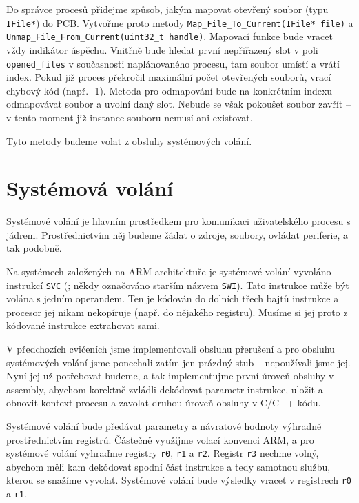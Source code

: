 \documentclass{article}
\begin{document}
Do správce procesů přidejme způsob, jakým mapovat otevřený soubor (typu \texttt{IFile*}) do PCB. Vytvořme proto metody \texttt{Map\_File\_To\_Current(IFile* file)} a \texttt{Unmap\_File\_From\_Current(uint32\_t handle)}. Mapovací funkce bude vracet vždy indikátor úspěchu. Vnitřně bude hledat první nepřiřazený slot v poli \texttt{opened\_files} v současnosti naplánovaného procesu, tam soubor umístí a vrátí index. Pokud již proces překročil maximální počet otevřených souborů, vrací chybový kód (např. -1). Metoda pro odmapování bude na konkrétním indexu odmapovávat soubor a uvolní daný slot. Nebude se však pokoušet soubor zavřít -- v tento moment již instance souboru nemusí ani existovat.

Tyto metody budeme volat z obsluhy systémových volání.

\section{Systémová volání}

Systémové volání je hlavním prostředkem pro komunikaci uživatelského procesu s jádrem. Prostřednictvím něj budeme žádat o zdroje, soubory, ovládat periferie, a tak podobně.

Na systémech založených na ARM architektuře je systémové volání vyvoláno instrukcí \texttt{SVC} (; někdy označováno starším názvem \texttt{SWI}). Tato instrukce může být volána s jedním operandem. Ten je kódován do dolních třech bajtů instrukce a procesor jej nikam nekopíruje (např. do nějakého registru). Musíme si jej proto z kódované instrukce extrahovat sami.

V předchozích cvičeních jsme implementovali obsluhu přerušení a pro obsluhu systémových volání jsme ponechali zatím jen prázdný stub -- nepoužívali jsme jej. Nyní jej už potřebovat budeme, a tak implementujme první úroveň obsluhy v assembly, abychom korektně zvládli dekódovat parametr instrukce, uložit a obnovit kontext procesu a zavolat druhou úroveň obsluhy v C/C++ kódu.

Systémové volání bude předávat parametry a návratové hodnoty výhradně prostřednictvím registrů. Částečně využijme volací konvenci ARM, a pro systémové volání vyhraďme registry \texttt{r0}, \texttt{r1} a \texttt{r2}. Registr \texttt{r3} nechme volný, abychom měli kam dekódovat spodní část instrukce a tedy samotnou službu, kterou se snažíme vyvolat. Systémové volání bude výsledky vracet v registrech \texttt{r0} a \texttt{r1}.
\end{document}
